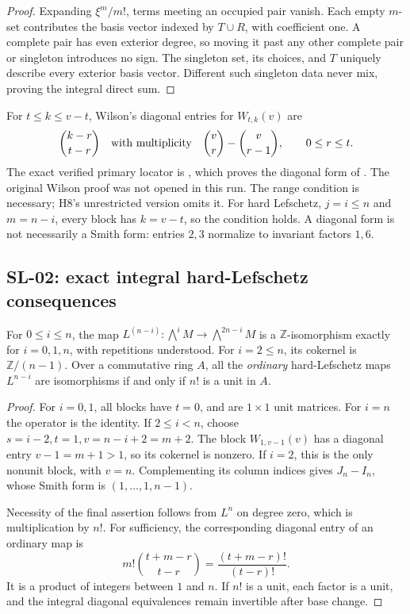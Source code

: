 \begin{proof}
Expanding $\xi^m/m!$, terms meeting an occupied pair vanish.  Each empty
$m$-set contributes the basis vector indexed by $T\cup R$, with coefficient
one.  A complete pair has even exterior degree, so moving it past any
other complete pair or singleton introduces no sign.  The singleton set,
its choices, and $T$ uniquely describe every exterior basis vector.
Different such singleton data never mix, proving the integral direct sum.
\end{proof}

For $t\le k\le v-t$, Wilson's diagonal entries for $W_{t,k}(v)$ are
\[
 \binom{k-r}{t-r}\quad\hbox{with multiplicity}\quad
 \binom vr-\binom v{r-1},\qquad 0\le r\le t.
\]
The exact verified primary locator is
\cite[Corollary 3, p.~10]{Ghorbani}, which proves the diagonal form of
\cite{Wilson}.  The original Wilson proof was not opened in this run.
The range condition is necessary; H8's unrestricted version omits it.
For hard Lefschetz, $j=i\le n$ and $m=n-i$, every block has $k=v-t$,
so the condition holds.  A diagonal form is not necessarily a Smith form:
entries $2,3$ normalize to invariant factors $1,6$.

\subsection{SL-02: exact integral hard-Lefschetz consequences}
\label{sl:integral}

For $0\le i\le n$, the map
$L^{(n-i)}:\bigwedge^iM\to\bigwedge^{2n-i}M$ is a
$\mathbb Z$-isomorphism exactly for $i=0,1,n$, with repetitions understood.
For $i=2\le n$, its cokernel is $\mathbb Z/(n-1)$.  Over a commutative
ring $A$, all the \emph{ordinary} hard-Lefschetz maps $L^{n-i}$ are
isomorphisms if and only if $n!$ is a unit in $A$.

\begin{proof}
For $i=0,1$, all blocks have $t=0$, and are $1\times1$ unit matrices.
For $i=n$ the operator is the identity.  If $2\le i<n$, choose
$s=i-2,t=1,v=n-i+2=m+2$.  The block $W_{1,v-1}(v)$ has a diagonal entry
$v-1=m+1>1$, so its cokernel is nonzero.  If $i=2$, this is the only
nonunit block, with $v=n$.  Complementing its column indices gives
$J_n-I_n$, whose Smith form is $(1,\ldots,1,n-1)$.

Necessity of the final assertion follows from $L^n$ on degree zero, which
is multiplication by $n!$.  For sufficiency, the corresponding diagonal
entry of an ordinary map is
\[
 m!\binom{t+m-r}{t-r}=\frac{(t+m-r)!}{(t-r)!}.
\]
It is a product of integers between $1$ and $n$.  If $n!$ is a unit,
each factor is a unit, and the integral diagonal equivalences remain
invertible after base change.
\end{proof}


